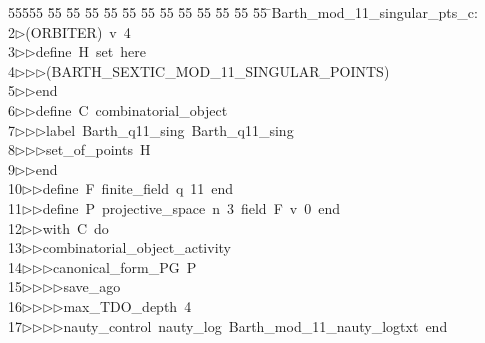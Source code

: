 %
%
\begin{tabbing}
55555 \= 55 \= 55 \= 55 \= 55 \= 55 \= 55 \= 55 \= 55 \= 55 \= 55 \= 55 \= 55 \= \>Barth\_mod\_11\_singular\_pts\_c:\\[0pt]
2\>$\triangleright$\>(ORBITER)\ v\ 4\ \\[0pt]
3\>$\triangleright$\>$\triangleright$\>define\ H\ set\ here\ \\[0pt]
4\>$\triangleright$\>$\triangleright$\>$\triangleright$\>(BARTH\_SEXTIC\_MOD\_11\_SINGULAR\_POINTS)\ \\[0pt]
5\>$\triangleright$\>$\triangleright$\>end\ \\[0pt]
6\>$\triangleright$\>$\triangleright$\>define\ C\ combinatorial\_object\ \\[0pt]
7\>$\triangleright$\>$\triangleright$\>$\triangleright$\>label\ Barth\_q11\_sing\ Barth\_q11\_sing\ \\[0pt]
8\>$\triangleright$\>$\triangleright$\>$\triangleright$\>set\_of\_points\ H\ \\[0pt]
9\>$\triangleright$\>$\triangleright$\>end\ \\[0pt]
10\>$\triangleright$\>$\triangleright$\>define\ F\ finite\_field\ q\ 11\ end\ \\[0pt]
11\>$\triangleright$\>$\triangleright$\>define\ P\ projective\_space\ n\ 3\ field\ F\ v\ 0\ end\ \\[0pt]
12\>$\triangleright$\>$\triangleright$\>with\ C\ do\ \\[0pt]
13\>$\triangleright$\>$\triangleright$\>combinatorial\_object\_activity\ \\[0pt]
14\>$\triangleright$\>$\triangleright$\>$\triangleright$\>canonical\_form\_PG\ P\ \\[0pt]
15\>$\triangleright$\>$\triangleright$\>$\triangleright$\>$\triangleright$\>save\_ago\ \\[0pt]
16\>$\triangleright$\>$\triangleright$\>$\triangleright$\>$\triangleright$\>max\_TDO\_depth\ 4\ \\[0pt]
17\>$\triangleright$\>$\triangleright$\>$\triangleright$\>$\triangleright$\>nauty\_control\ nauty\_log\ Barth\_mod\_11\_nauty\_logtxt\ end\ \\[0pt]

\end{tabbing}
